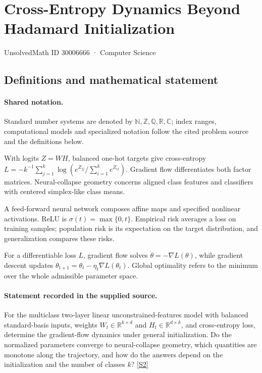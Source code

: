 \documentclass[11pt]{article}
\newcommand{\sref}[2]{\hyperlink{source:#1:#2}{[S#2]}}
\begin{document}
\setcounter{section}{30006665}
\section{Cross-Entropy Dynamics Beyond Hadamard Initialization}\label{30006666}
{\small\sffamily UnsolvedMath ID 30006666 · Computer Science}
\subsection{Definitions and mathematical statement}

\paragraph{Shared notation.}Standard number systems are denoted by $\mathbb N,\mathbb Z,\mathbb Q,\mathbb R,\mathbb C$; index ranges, computational models and specialized notation follow the cited problem source and the definitions below.


With logits $Z=WH$, balanced one-hot targets give cross-entropy $L=-k^{-1}\sum_{j=1}^k\log(e^{Z_{jj}}/\sum_{i=1}^ke^{Z_{ij}})$. Gradient flow differentiates both factor matrices. Neural-collapse geometry concerns aligned class features and classifiers with centered simplex-like class means.

A feed-forward neural network composes affine maps and specified nonlinear activations. ReLU is $\sigma(t)=\max\{0,t\}$. Empirical risk averages a loss on training samples; population risk is its expectation on the target distribution, and generalization compares these risks.

For a differentiable loss $L$, gradient flow solves $\dot\theta=-\nabla L(\theta)$, while gradient descent updates $\theta_{t+1}=\theta_t-\eta_t\nabla L(\theta_t)$. Global optimality refers to the minimum over the whole admissible parameter space.
\paragraph{Statement recorded in the supplied source.}
For the multiclass two-layer linear unconstrained-features model with balanced standard-basis inputs, weights $W_t\in\mathbb R^{k\times d}$ and $H_t\in\mathbb R^{d\times k}$, and cross-entropy loss, determine the gradient-flow dynamics under general initialization. Do the normalized parameters converge to neural-collapse geometry, which quantities are monotone along the trajectory, and how do the answers depend on the initialization and the number of classes $k$? \sref{30006666}{2}
\end{document}
